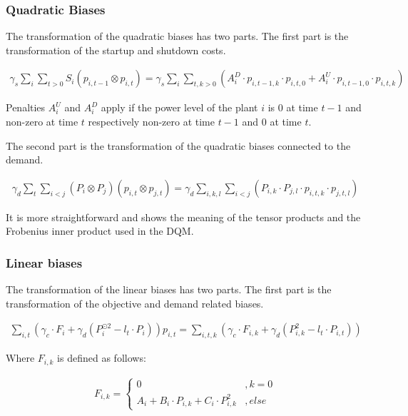\subsubsection{Quadratic Biases}

The transformation of the quadratic biases has two parts.
The first part is the transformation of the startup and shutdown costs.

\begin{align}
  \gamma_s \sum_i \sum_{t > 0} S_i \left( p_{i, t-1} \otimes p_{i, t} \right)
  = \gamma_s \sum_i \sum_{t, k > 0} \left(
    A_i^D \cdot p_{i, t-1, k} \cdot p_{i, t, 0}
    + A_i^U \cdot p_{i, t-1, 0} \cdot p_{i, t, k}
  \right)
\end{align}

Penalties $A_i^U$ and $A_i^D$ apply if the power level of the plant $i$ is $0$ at time $t-1$ and non-zero at time $t$ respectively non-zero at time $t-1$ and $0$ at time $t$.

The second part is the transformation of the quadratic biases connected to the demand.

\begin{align}
  \gamma_d \sum_t \sum_{i < j} \left( P_i \otimes P_j \right) \left( p_{i, t} \otimes p_{j, t} \right)
  = \gamma_d \sum_{i, k, l} \sum_{i < j} \left( P_{i,k} \cdot P_{j,l} \cdot p_{i, t, k} \cdot p_{j, t, l} \right)
\end{align}

It is more straightforward and shows the meaning of the tensor products and the Frobenius inner product used in the DQM.

\subsubsection{Linear biases}

The transformation of the linear biases has two parts.
The first part is the transformation of the objective and demand related biases.

\begin{align}
  \sum_{i, t} \left(
    \gamma_c \cdot F_i + \gamma_d \left( P_i^{\odot 2} - l_t \cdot P_i \right)
  \right) p_{i, t}
  =
  \sum_{i, t, k} \left(
    \gamma_c \cdot F_{i, k} + \gamma_d \left( P_{i, k}^2 - l_t \cdot P_{i, t} \right)
  \right)
\end{align}

Where $F_{i, k}$ is defined as follows:

\begin{align}
  F_{i, k} = \begin{cases}
    0 & , k = 0 \\
    A_i + B_i \cdot P_{i, k} + C_i \cdot P_{i, k}^2 & , else
  \end{cases}
\end{align}

